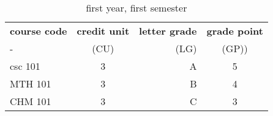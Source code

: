 \documentclass{article}
\begin{document}
	\begin{table}[h!]
		\begin{center}
			\caption{first year, first semester}
			\label{tab:table1}
	\begin{tabular}{|l|c|r|c|}
				\hline
				\textbf{course code} & \textbf{credit unit} & \textbf{letter grade} & \textbf{grade point}\\
				- & (CU) & (LG) & (GP))\\
				\hline
				csc 101 & 3 & A & 5\\
				MTH 101 & 3 & B & 4\\
				CHM 101 & 3 & C & 3\\
				\hline
			\end{tabular}
		\end{center}
	\end{table}
\end{document}
